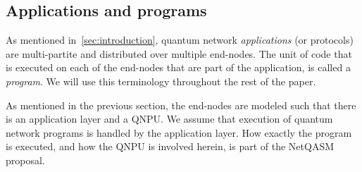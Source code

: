 \subsection{Applications and programs}
As mentioned in~\cref{sec:introduction}, quantum network \textit{applications} (or protocols) are multi-partite and distributed over multiple end-nodes.
The unit of code that is executed on each of the end-nodes that are part of the application, is called a \textit{program}.
We will use this terminology throughout the rest of the paper.

As mentioned in the previous section, the end-nodes are modeled such that there is an application layer and a \ac{QNPU}. We assume that execution of quantum network programs is handled by the application layer.
How exactly the program is executed, and how the \ac{QNPU} is involved herein, is part of the \ac{NetQASM} proposal.